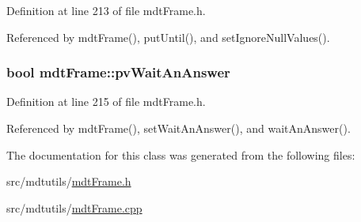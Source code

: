 Definition at line 213 of file mdt\-Frame.\-h.



Referenced by mdt\-Frame(), put\-Until(), and set\-Ignore\-Null\-Values().

\hypertarget{classmdt_frame_aac030954a872c41f7fb917912e16a77f}{
\subsubsection[{pv\-Wait\-An\-Answer}]{\setlength{\rightskip}{0pt plus 5cm}bool mdt\-Frame\-::pv\-Wait\-An\-Answer\hspace{0.3cm}{\ttfamily [protected]}}}\label{classmdt_frame_aac030954a872c41f7fb917912e16a77f}


Definition at line 215 of file mdt\-Frame.\-h.



Referenced by mdt\-Frame(), set\-Wait\-An\-Answer(), and wait\-An\-Answer().



The documentation for this class was generated from the following files\-:\begin{DoxyCompactItemize}
\item 
src/mdtutils/\hyperlink{mdt_frame_8h}{mdt\-Frame.\-h}\item 
src/mdtutils/\hyperlink{mdt_frame_8cpp}{mdt\-Frame.\-cpp}\end{DoxyCompactItemize}
